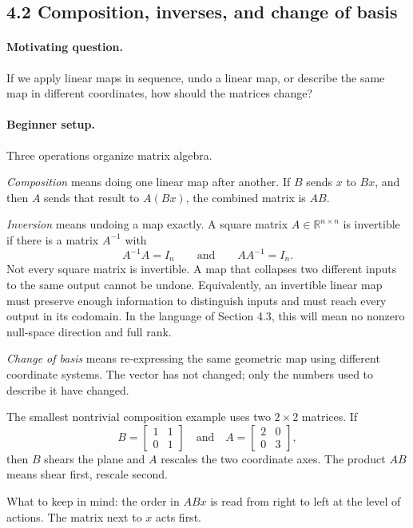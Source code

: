 \subsection{4.2 Composition, inverses, and change of basis}

\paragraph{Motivating question.}
If we apply linear maps in sequence, undo a linear map, or describe the same map in different coordinates, how should the matrices change?

\paragraph{Beginner setup.}
Three operations organize matrix algebra.

\emph{Composition} means doing one linear map after another. If \(B\) sends \(x\) to \(Bx\), and then \(A\) sends that result to \(A(Bx)\), the combined matrix is \(AB\).

\emph{Inversion} means undoing a map exactly. A square matrix \(A\in\mathbb{R}^{n\times n}\) is invertible if there is a matrix \(A^{-1}\) with
\[
A^{-1}A=I_n
\qquad\text{and}\qquad
AA^{-1}=I_n.
\]
Not every square matrix is invertible. A map that collapses two different inputs to the same output cannot be undone.
Equivalently, an invertible linear map must preserve enough information to distinguish inputs and must reach every output in its codomain. In the language of Section 4.3, this will mean no nonzero null-space direction and full rank.

\emph{Change of basis} means re-expressing the same geometric map using different coordinate systems. The vector has not changed; only the numbers used to describe it have changed.

The smallest nontrivial composition example uses two \(2\times 2\) matrices. If
\[
B=
\begin{bmatrix}
1&1\\
0&1
\end{bmatrix}
\quad\text{and}\quad
A=
\begin{bmatrix}
2&0\\
0&3
\end{bmatrix},
\]
then \(B\) shears the plane and \(A\) rescales the two coordinate axes. The product \(AB\) means shear first, rescale second.

What to keep in mind: the order in \(ABx\) is read from right to left at the level of actions. The matrix next to \(x\) acts first.

